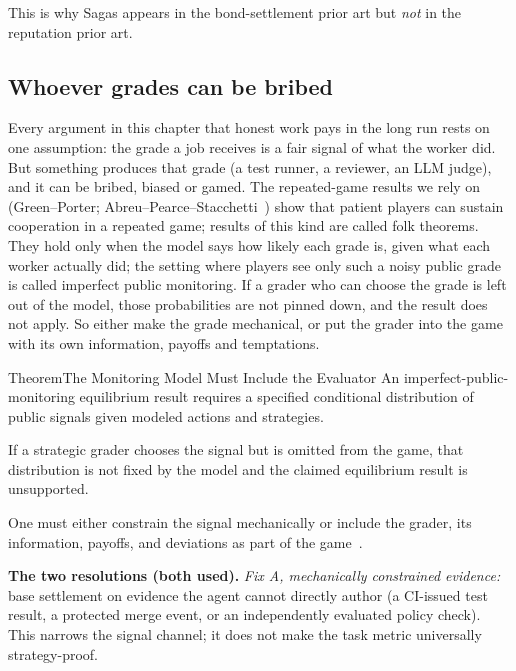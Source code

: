 \documentclass[11pt,a4paper]{article}
\theoremstyle{definition}
\theoremstyle{definition}
\theoremstyle{remark}
\begin{document}
This is why Sagas appears in the bond-settlement prior art but \emph{not} in the
reputation prior art.

\subsection{Whoever grades can be bribed}

Every argument in this chapter that honest work pays in the long run rests on
one assumption: the grade a job receives is a fair signal of what the worker
did. But something produces that grade (a test runner, a reviewer, an LLM
judge), and it can be bribed, biased or gamed. The repeated-game results we
rely on (Green--Porter; Abreu--Pearce--Stacchetti~) show that
patient players can sustain cooperation in a repeated game; results of this
kind are called folk theorems. They hold only when the model says how likely each grade is, given what each worker actually
did; the setting where players see only such a noisy public grade is called
imperfect public monitoring. If a grader who can choose the grade is left out
of the model, those probabilities are not pinned down, and the result does
not apply. So either make the grade mechanical, or put the grader into the
game with its own information, payoffs and temptations.


\begin{pdclaim}{Theorem}{The Monitoring Model Must Include the Evaluator}
\setlength{\parskip}{4pt plus 1pt}
\label{thm:folk}
An imperfect-public-monitoring equilibrium result requires a specified conditional
distribution of public signals given modeled actions and strategies.

If a strategic
grader chooses the signal but is omitted from the game, that distribution is not
fixed by the model and the claimed equilibrium result is unsupported.

One must
either constrain the signal mechanically or include the grader, its information,
payoffs, and deviations as part of the game~.
\end{pdclaim}

\noindent\textbf{The two resolutions (both used).}
\emph{Fix A, mechanically constrained evidence:} base settlement on evidence
the agent cannot directly author (a CI-issued test result, a protected merge event,
or an independently evaluated policy check). This narrows the signal channel; it
does not make the task metric universally strategy-proof.
\end{document}
